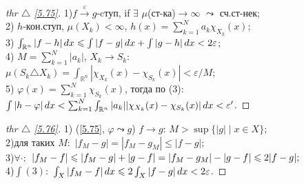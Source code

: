 
\begin{minipage}[]{0.49\textwidth}
\begin{proof}[
thr $\triangle$
\eqref{5.75}]

\phantom{42}
\noindent

1)$f \overset{\varepsilon}{\to} g$-cтуп, if $\exists$ $\mu$(ст-ка)$\to \infty$ $\leadsto$ сч.ст-нек;\\
2) $h$-кон.ступ, $\mu(X_k)<\infty$, $h(x) = \sum\limits_{ k=1 }^{ N } a_k \chi_{X_k} (x)$;\\
3) $\int_{\mathbb{R}^n} |f - h|\d x \leq \int|f-g|\d x + \int|g-h| \d x < 2\varepsilon$;\\
4) $M=\sum\nolimits_{ k=1 }^{ N }|a_k|$, $X_k \to S_k:$\\ $\mu(S_k \triangle X_k) = \int_{\mathbb{R}^n}|\chi_{X_k}(x) - \chi_{S_k}(x)| < \varepsilon/M$;\\
5) $\varphi(x) = \sum\nolimits_{ k=1 }^{ N } \chi_{S_k}(x)$, тогда по (3):\\
$\int |h - \varphi| \d x < \sum\nolimits_{ k=1 }^{ N } \int_{\mathbb{R}^n}|a_k||\chi_{X_k}(x) - \chi_{S_k}(x)| \d x < \varepsilon'$.

\end{proof}
\end{minipage}
\hfill
\begin{minipage}[]{0.45\textwidth}
\begin{proof}[
 thr $\triangle$
\eqref{5.76}]

\phantom{42}
\noindent

1) (\ref{5.75}, $\varphi \leadsto g$) $f \to g$: $M>\sup\{|g| \mid x\in X\}$;\\
2)для таких $M:$ $|f_M - g| = |f_M - g_M| \leq |f-g|;$\\
3)$\forall \cdot:$ $|f_M - f| \leq |f_M - g|+|g -f| =\\ |f_M - g_M| - |g - f| \leq 2|f-g|;$\\
4)$\int(3):$ $\int_X |f_M - f| \d x \leq 2 \int_X |f-g|\d x < 2\varepsilon$. 

\end{proof}
\end{minipage}
